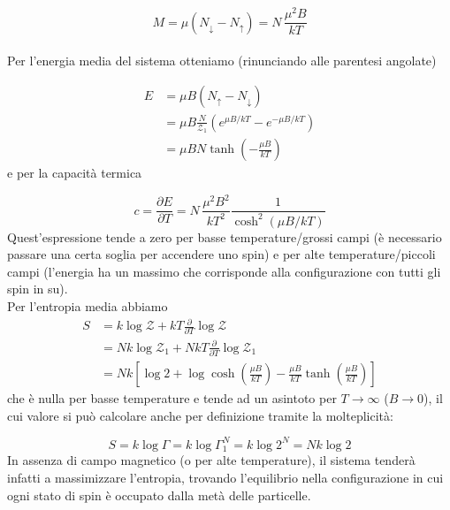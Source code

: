 \documentclass[a4paper]{report}
\newcommand\ddfrac[2]{\frac{\displaystyle #1}{\displaystyle #2}}
\begin{document}
\begin{equation}
    M = \mu (N_{\downarrow} - N_{\uparrow}) = N\,\frac{\mu^2 B}{k T}
\end{equation}\\
Per l'energia media del sistema otteniamo (rinunciando alle parentesi angolate)

\begin{equation}
    \begin{split}
        E & =  \mu B (N_{\uparrow} - N_{\downarrow}) \\
        & = \mu B \frac{N}{\mathcal{Z}_1}(e^{\mu B/k T} - e^{-\mu B/k T}) \\
        & = \mu B N \tanh\left(-\frac{\mu B}{k T}\right)
    \end{split}
\end{equation}
e per la capacità termica

\begin{equation}
    c = \frac{\partial E}{\partial T} = N\,\frac{\mu^2 B^2}{k T^2}\ddfrac{1}{\cosh^2\left(\mu B / k T\right)}
\end{equation}
Quest'espressione tende a zero per basse temperature/grossi campi (è necessario passare una certa soglia per accendere uno spin) e per alte temperature/piccoli campi (l'energia ha un massimo che corrisponde alla configurazione con tutti gli spin in su).\\
Per l'entropia media abbiamo
\begin{equation}
    \begin{split}
        S & = k \log \mathcal{Z} + k T \frac{\partial}{\partial T}\log \mathcal{Z}\\
        & = N k \log \mathcal{Z}_1 + N k T \frac{\partial}{\partial T}\log \mathcal{Z}_1\\
        & = N k \left[\log 2 +\log \cosh\left(\frac{\mu B}{k T}\right)- \frac{\mu B}{k T}\tanh \left(\frac{\mu B}{k T}\right)\right]
    \end{split}
\end{equation}
che è nulla per basse temperature e tende ad un asintoto per $T\rightarrow \infty$ ($B\rightarrow 0$), il cui valore si può calcolare anche per definizione tramite la molteplicità:

\begin{equation}
    S = k \log \Gamma = k \log \Gamma_1^N = k \log 2^N = N k\log2
\end{equation}
In assenza di campo magnetico (o per alte temperature), il sistema tenderà infatti a massimizzare l'entropia, trovando l'equilibrio nella configurazione in cui ogni stato di spin è occupato dalla metà delle particelle.
\end{document}

